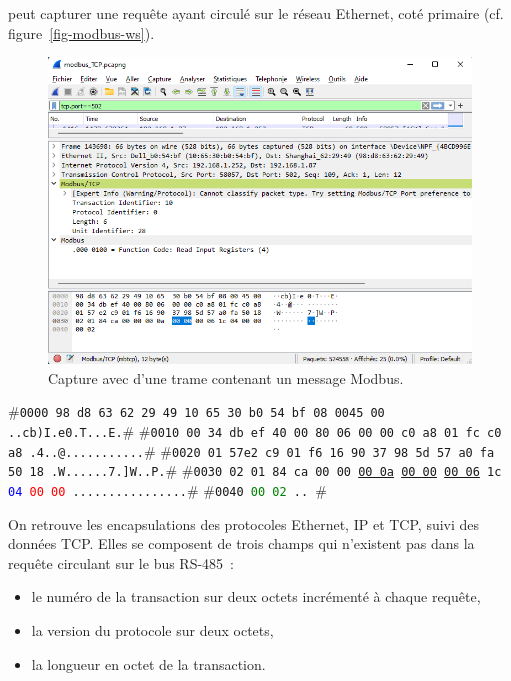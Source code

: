    \vspace{1em}

 peut capturer une requête ayant circulé sur le réseau Ethernet, coté primaire (cf. figure~\vref{fig-modbus-ws}).

\begin{figure}[tbp]
\centerline{\includegraphics[width=1\columnwidth]{Pictures/modbus-ws.png}}
\caption{Capture avec  d'une trame contenant un message Modbus.}
\label{fig-modbus-ws}
\end{figure}


\begin{termc}[backgroundcolor=\color{backcolour}, escapechar=#]
#\texttt{\small{0000 \colorbox{purple!50}{98 d8 63 62 29 49 10 65 30 b0 54 bf 08 00}\colorbox{blue!30}{45 00}   ..cb)I.e0.T...E.}}#
#\texttt{\small{0010  \colorbox{blue!30}{00 34 db ef 40 00 80 06 00 00 c0 a8 01 fc c0 a8}   .4..@...........}}#
#\texttt{\small{0020  \colorbox{blue!30}{01 57}\colorbox{red!30}{e2 c9 01 f6 16 90 37 98 5d 57 a0 fa 50 18}   .W......7.]W..P.}}#
#\texttt{\small{0030  \colorbox{red!30}{02 01 84 ca 00 00} \ul{00 0a} \ul{00 00} \ul{00 06} 1c \textcolor{blue}{04} \textcolor{red}{00 00}   ................}}#
#\texttt{\small{0040  \textcolor{green}{00 02}   ..              }}#                                 
\end{termc}

On retrouve les encapsulations des protocoles Ethernet, IP et TCP, suivi des données TCP. Elles se composent de  trois champs qui n'existent pas dans la requête circulant sur le bus RS-485~:
\begin{itemize}
    \item le numéro de la transaction sur deux octets incrémenté à chaque requête,
    \item la version du protocole sur deux octets, 
    \item la longueur en octet de la transaction.
\end{itemize}

